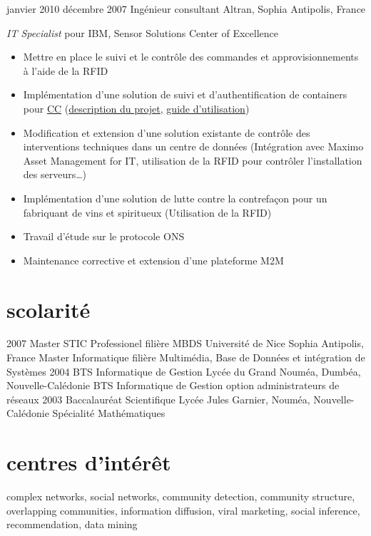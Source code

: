\documentclass[print]{roger-cv}
\begin{document}
\begin{entrylist}
  \entry
    {janvier 2010}
    {décembre 2007}
    {Ingénieur consultant}
    {Altran, Sophia Antipolis, France}  
    {
      \emph{IT Specialist} pour IBM, Sensor Solutions Center of Excellence\\
      \vspace{-3mm}
          \begin{itemize}
 	    \item Mettre en place le suivi et le contrôle des commandes et approvisionnements à l'aide de la RFID
 	    \item Implémentation d'une solution de suivi et d'authentification de containers pour \href{http://www.container-centralen.com/}{CC} (\href{http://www.container-centralen.co.uk/rfid/history.aspx}{description du projet}, \href{http://www.container-centralen.co.uk/rfid/user\%20guide\%20for\%20scanning.aspx}{guide d'utilisation})
               \item Modification et extension d'une solution existante de contrôle des interventions techniques dans un centre de données 
 	    (Intégration avec Maximo Asset Management for IT, utilisation de la RFID pour contrôler l'installation des serveurs\ldots)
 	    \item Implémentation d'une solution de lutte contre la contrefaçon pour un fabriquant de vins et spiritueux (Utilisation de la RFID)
 	    \item Travail d'étude sur le protocole ONS
 	    \item Maintenance corrective et extension d'une plateforme M2M
 	\end{itemize}
    }

\end{entrylist}

\section{scolarité}

\begin{entrylist}
  \entry
    {2007}
    {}
    {Master STIC Professionel {\normalfont filière MBDS}}
    {Université de Nice Sophia Antipolis, France}
    {Master Informatique filière Multimédia, Base de Données et intégration de Systèmes}
  \entry
    {2004}
    {}
    {BTS Informatique de Gestion}
    {Lycée du Grand Nouméa, Dumbéa, Nouvelle-Calédonie}
    {BTS Informatique de Gestion option administrateurs de réseaux}
  \entry
    {2003}
    {}
    {Baccalauréat Scientifique}
    {Lycée Jules Garnier, Nouméa, Nouvelle-Calédonie}
    {Spécialité Mathématiques}
\end{entrylist}

\section{centres d'intérêt}

complex networks, social networks, community detection, community structure,
overlapping communities, information diffusion, viral marketing, social
inference, recommendation, data mining
\end{document}
